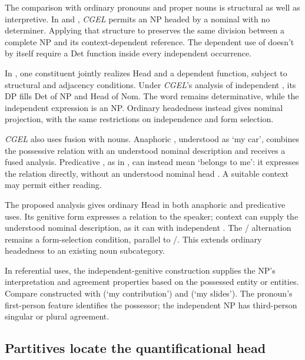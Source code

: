 \documentclass[12pt]{article}
\begin{document}
The comparison with ordinary pronouns and proper nouns is structural as well as interpretive. In  and , \textit{CGEL} permits an NP headed by a nominal with no determiner. Applying that structure to  preserves the same division between a complete NP and its context-dependent reference. The dependent use of  doesn't by itself require a Det function inside every independent occurrence.

In \textcite{Payne2007}, one constituent jointly realizes Head and a dependent function, subject to structural and adjacency conditions. Under \textit{CGEL}'s analysis of independent , its DP fills Det of NP and Head of Nom. The word remains determinative, while the independent expression is an NP. Ordinary headedness instead gives  nominal projection, with the same restrictions on independence and form selection.

\textit{CGEL} also uses fusion with nouns. Anaphoric , understood as \enquote*{my car}, combines the possessive relation with an understood nominal description and receives a fused analysis. Predicative , as in , can instead mean \enquote*{belongs to me}: it expresses the relation directly, without an understood nominal head \citep[410--411, 470--471]{huddleston2002}. A suitable context may permit either reading.

The proposed analysis gives  ordinary Head in both anaphoric and predicative uses. Its genitive form expresses a relation to the speaker; context can supply the understood nominal description, as it can with independent . The / alternation remains a form-selection condition, parallel to /. This extends ordinary headedness to an existing noun subcategory.

In referential uses, the independent-genitive construction supplies the NP's interpretation and agreement properties based on the possessed entity or entities. Compare constructed  with  (\enquote*{my contribution}) and  (\enquote*{my slides}). The pronoun's first-person feature identifies the possessor; the independent NP has third-person singular or plural agreement.

\subsection{Partitives locate the quantificational head}
\end{document}
